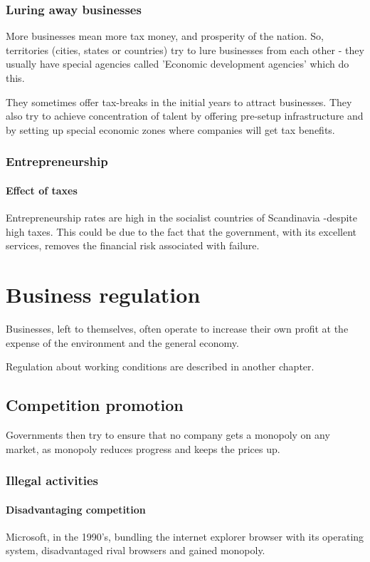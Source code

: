\documentclass[oneside, article]{memoir}
\begin{document}
\subsection{Luring away businesses}
More businesses mean more tax money, and prosperity of the nation. So, territories (cities, states or countries) try to lure businesses from each other - they usually have special agencies called 'Economic development agencies' which do this.

They sometimes offer tax-breaks in the initial years to attract businesses. They also try to achieve concentration of talent by offering pre-setup infrastructure and by setting up special economic zones where companies will get tax benefits.

\subsection{Entrepreneurship}
\subsubsection{Effect of taxes}
Entrepreneurship rates are high in the socialist countries of Scandinavia -despite high taxes. This could be due to the fact that the government, with its excellent services, removes the financial risk associated with failure.


\chapter{Business regulation}
Businesses, left to themselves, often operate to increase their own profit at the expense of the environment and the general economy.

Regulation about working conditions are described in another chapter.

\section{Competition promotion}
Governments then try to ensure that no company gets a monopoly on any market, as monopoly reduces progress and keeps the prices up.

\subsection{Illegal activities}
\subsubsection{Disadvantaging competition}
Microsoft, in the 1990's, bundling the internet explorer browser with its operating system, disadvantaged rival browsers and gained monopoly.
\end{document}
